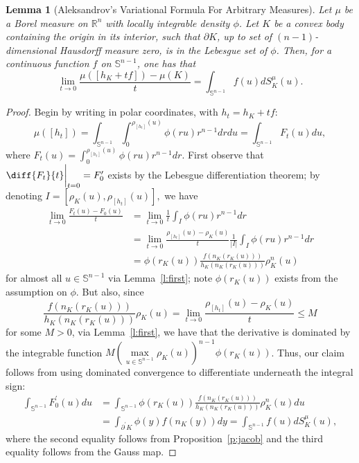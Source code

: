 \documentclass[11pt]{amsart}
\newtheorem{lemma}[theorem]{Lemma}
\theoremstyle{definition}
\theoremstyle{remark}
\numberwithin{equation}{section}
\newcommand{\R}{\mathbb{R}}
\newcommand{\s}{\mathbb{S}}
\begin{document}
	\begin{lemma}[Aleksandrov's Variational Formula For Arbitrary Measures]
	\label{l:second}
	Let $\mu$ be a Borel measure on $\R^n$ with locally integrable density $\phi$. Let $K$ be a convex body containing the origin in its interior, such that $\partial K$, up to set of $(n-1)$-dimensional Hausdorff measure zero, is in the Lebesgue set of $\phi$. Then, for a continuous function $f$ on $\s^{n-1}$, one has that
	$$\lim_{t\rightarrow 0}\frac{\mu([h_K+tf])-\mu(K)}{t}=\int_{\s^{n-1}}f(u)dS^{\mu}_{K}(u).$$
	\end{lemma}
	\begin{proof}
	Begin by writing in polar coordinates, with $h_t=h_K+tf$:
	$$\mu([h_t])=\int_{\s^{n-1}}\int_0^{\rho_{[h_t]}(u)}\phi(ru)r^{n-1}drdu=\int_{\s^{n-1}}F_t(u)du,$$
	where
	$F_t(u)=\int_0^{\rho_{[h_t]}(u)}\phi(ru)r^{n-1}dr.$ First observe that $\diff{F_t}{t}\bigg|_{t=0}=F^\prime_0$ exists by the Lebesgue differentiation theorem; by denoting $I=[\rho_{K}(u),\rho_{[h_t]}(u)],$ we have
	\begin{align*}\lim_{t\to 0}\frac{F_t(u)-F_0(u)}{t}&=\lim_{t\to 0}\frac{1}{t}\int_{I}\phi(ru)r^{n-1}dr
 \\
	&=\lim_{t\to 0}\frac{\rho_{[h_t]}(u)-\rho_{K}(u)}{t}\frac{1}{|I|}\int_I \phi(ru)r^{n-1}dr
	\\
	&=\phi(r_K(u))\frac{f(n_{K}(r_{K}(u)))}{h_K(n_K(r_K(u)))}\rho^{n}_K(u)\end{align*} for almost all $u\in\s^{n-1}$ via Lemma~\ref{l:first}; note $\phi(r_K(u))$ exists from the assumption on $\phi$. But also, since
	$$\frac{f(n_{K}(r_{K}(u)))}{h_K(n_K(r_K(u)))}\rho_K(u)=\lim_{t\to 0}\frac{\rho_{[h_t]}(u)-\rho_{K}(u)}{t}\leq M$$
	for some $M>0$, via Lemma~\ref{l:first}, we have that the derivative is dominated by the integrable function $M\left(\underset{u\in\s^{n-1}}{\max}\rho_K(u)\right)^{n-1}\phi(r_K(u))$. Thus, our claim follows from using dominated convergence to differentiate underneath the integral sign:
	\begin{align*}
	    \int_{\s^{n-1}}F^\prime_0(u)du&=\int_{\s^{n-1}}\phi(r_K(u))\frac{f(n_{K}(r_{K}(u)))}{h_K(n_K(r_K(u)))}\rho^n_K(u)du
	    \\
	    &=\int_{\partial^\prime K}\phi(y)f(n_K(y))dy = \int_{\s^{n-1}}f(u)dS^{\mu}_{K}(u),
	\end{align*}
	where the second equality follows from Proposition~\ref{p:jacob} and the third equality follows from the Gauss map. 
	\end{proof}
\end{document}
